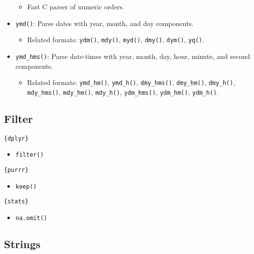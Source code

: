 \documentclass[
]{book}
\providecommand{\tightlist}{%
  \setlength{\itemsep}{0pt}\setlength{\parskip}{0pt}}
\begin{document}
\begin{itemize}
  \begin{itemize}
  \tightlist
  \item
    Fast C parser of numeric orders.
  \end{itemize}
\item
  \texttt{ymd()}: Parse dates with year, month, and day components.

  \begin{itemize}
  \tightlist
  \item
    Related formats: \texttt{ydm()}, \texttt{mdy()}, \texttt{myd()}, \texttt{dmy()}, \texttt{dym()}, \texttt{yq()}.
  \end{itemize}
\item
  \texttt{ymd\_hms()}: Parse date-times with year, month, day, hour, minute, and second components.

  \begin{itemize}
  \tightlist
  \item
    Related formats: \texttt{ymd\_hm()}, \texttt{ymd\_h()}, \texttt{dmy\_hms()}, \texttt{dmy\_hm()}, \texttt{dmy\_h()}, \texttt{mdy\_hms()}, \texttt{mdy\_hm()}, \texttt{mdy\_h()}, \texttt{ydm\_hms()}, \texttt{ydm\_hm()}, \texttt{ydm\_h()}.
  \end{itemize}
\end{itemize}

\hypertarget{filter}{%
\subsection{Filter}\label{filter}}

\texttt{\{dplyr\}}

\begin{itemize}
\tightlist
\item
  \texttt{filter()}
\end{itemize}

\texttt{\{purrr\}}

\begin{itemize}
\tightlist
\item
  \texttt{keep()}
\end{itemize}

\texttt{\{stats\}}

\begin{itemize}
\tightlist
\item
  \texttt{na.omit()}
\end{itemize}

\hypertarget{strings}{%
\subsection{Strings}\label{strings}}
\end{document}
